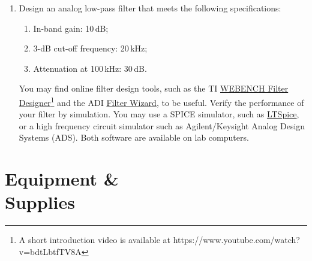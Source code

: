 \documentclass[letterpaper, 11pt]{article}
\begin{document}
\begin{enumerate}[itemsep=0.1ex, label=\alph*)]
	\item Design an analog low-pass filter that meets the following specifications: 
		\begin{enumerate}
			\item In-band gain: 10\,dB;
			\item 3-dB cut-off frequency: 20\,kHz;
			\item Attenuation at 100\,kHz: 30\,dB.
		\end{enumerate}
	You may find online filter design tools, such as the TI \href{http://www.ti.com/lsds/ti/analog/webench/webench-filters.page}{WEBENCH Filter Designer\footnote{A short introduction video is available at \url{https://www.youtube.com/watch?v=bdtLbtfTV8A}}} and the ADI \href{http://www.analog.com/designtools/en/filterwizard/}{Filter Wizard}, to be useful. Verify the performance of your filter by simulation. You may use a SPICE simulator, such as \href{http://www.linear.com/designtools/software/}{LTSpice}, or a high frequency circuit simulator such as Agilent/Keysight Analog Design Systems (ADS). Both software are available on lab computers. 
	
\end{enumerate}

\newpage
\section{Equipment \& \\Supplies}
\end{document}
